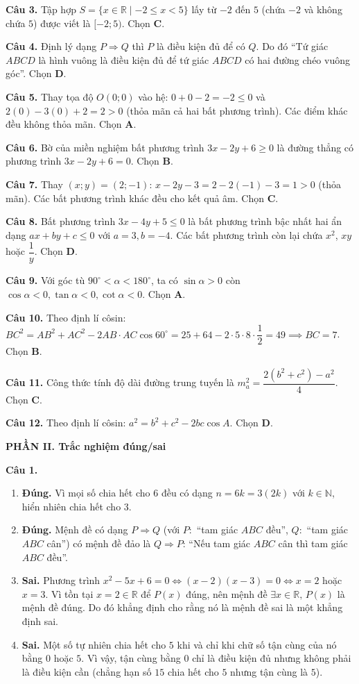 \documentclass[12pt,a4paper]{article}
\begin{document}
\textbf{Câu 3.} Tập hợp $S = \{x \in \mathbb{R} \mid -2 \le x < 5\}$ lấy từ $-2$ đến $5$ (chứa $-2$ và không chứa $5$) được viết là $[-2; 5)$. Chọn \textbf{C}.

\textbf{Câu 4.} Định lý dạng $P \Rightarrow Q$ thì $P$ là điều kiện đủ để có $Q$. Do đó ``Tứ giác $ABCD$ là hình vuông là điều kiện đủ để tứ giác $ABCD$ có hai đường chéo vuông góc''. Chọn \textbf{D}.

\textbf{Câu 5.} Thay tọa độ $O(0; 0)$ vào hệ: $0 + 0 - 2 = -2 \le 0$ và $2(0) - 3(0) + 2 = 2 > 0$ (thỏa mãn cả hai bất phương trình). Các điểm khác đều không thỏa mãn. Chọn \textbf{A}.

\textbf{Câu 6.} Bờ của miền nghiệm bất phương trình $3x - 2y + 6 \ge 0$ là đường thẳng có phương trình $3x - 2y + 6 = 0$. Chọn \textbf{B}.

\textbf{Câu 7.} Thay $(x; y) = (2; -1)$: $x - 2y - 3 = 2 - 2(-1) - 3 = 1 > 0$ (thỏa mãn). Các bất phương trình khác đều cho kết quả âm. Chọn \textbf{C}.

\textbf{Câu 8.} Bất phương trình $3x - 4y + 5 \le 0$ là bất phương trình bậc nhất hai ẩn dạng $ax + by + c \le 0$ với $a = 3, b = -4$. Các bất phương trình còn lại chứa $x^2$, $xy$ hoặc $\dfrac{1}{y}$. Chọn \textbf{D}.

\textbf{Câu 9.} Với góc tù $90^\circ < \alpha < 180^\circ$, ta có $\sin \alpha > 0$ còn $\cos \alpha < 0, \tan \alpha < 0, \cot \alpha < 0$. Chọn \textbf{A}.

\textbf{Câu 10.} Theo định lí côsin: $BC^2 = AB^2 + AC^2 - 2 AB \cdot AC \cos 60^\circ = 25 + 64 - 2 \cdot 5 \cdot 8 \cdot \dfrac{1}{2} = 49 \implies BC = 7$. Chọn \textbf{B}.

\textbf{Câu 11.} Công thức tính độ dài đường trung tuyến là $m_a^2 = \dfrac{2(b^2 + c^2) - a^2}{4}$. Chọn \textbf{C}.

\textbf{Câu 12.} Theo định lí côsin: $a^2 = b^2 + c^2 - 2bc \cos A$. Chọn \textbf{D}.

\vspace{0.2cm}
\textbf{\large PHẦN II. Trắc nghiệm đúng/sai}

\textbf{Câu 1.}
\begin{enumerate}
    \item \textbf{Đúng.} Vì mọi số chia hết cho $6$ đều có dạng $n = 6k = 3(2k)$ với $k \in \mathbb{N}$, hiển nhiên chia hết cho $3$.
    \item \textbf{Đúng.} Mệnh đề có dạng $P \Rightarrow Q$ (với $P\colon$ ``tam giác $ABC$ đều'', $Q\colon$ ``tam giác $ABC$ cân'') có mệnh đề đảo là $Q \Rightarrow P$: ``Nếu tam giác $ABC$ cân thì tam giác $ABC$ đều''.
    \item \textbf{Sai.} Phương trình $x^2 - 5x + 6 = 0 \iff (x - 2)(x - 3) = 0 \iff x = 2$ hoặc $x = 3$. Vì tồn tại $x = 2 \in \mathbb{R}$ để $P(x)$ đúng, nên mệnh đề $\exists x \in \mathbb{R},\, P(x)$ là mệnh đề đúng. Do đó khẳng định cho rằng nó là mệnh đề sai là một khẳng định sai.
    \item \textbf{Sai.} Một số tự nhiên chia hết cho $5$ khi và chỉ khi chữ số tận cùng của nó bằng $0$ hoặc $5$. Vì vậy, tận cùng bằng $0$ chỉ là điều kiện đủ nhưng không phải là điều kiện cần (chẳng hạn số $15$ chia hết cho $5$ nhưng tận cùng là $5$).
\end{enumerate}
\end{document}
